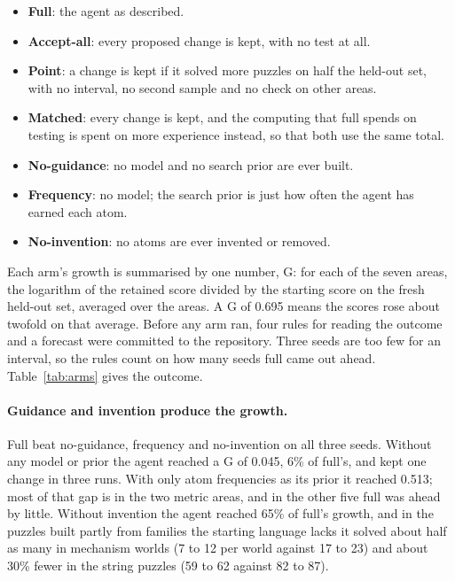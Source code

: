 \documentclass[11pt]{article}
\begin{document}
\begin{itemize}[leftmargin=*]
\item \textbf{Full}: the agent as described.
\item \textbf{Accept-all}: every proposed change is kept, with no test at all.
\item \textbf{Point}: a change is kept if it solved more puzzles on half the held-out set, with no interval, no second sample and no check on other areas.
\item \textbf{Matched}: every change is kept, and the computing that full spends on testing is spent on more experience instead, so that both use the same total.
\item \textbf{No-guidance}: no model and no search prior are ever built.
\item \textbf{Frequency}: no model; the search prior is just how often the agent has earned each atom.
\item \textbf{No-invention}: no atoms are ever invented or removed.
\end{itemize}

Each arm's growth is summarised by one number, G: for each of the seven areas, the logarithm of the retained score divided by the starting score on the fresh held-out set, averaged over the areas. A G of 0.695 means the scores rose about twofold on that average. Before any arm ran, four rules for reading the outcome and a forecast were committed to the repository. Three seeds are too few for an interval, so the rules count on how many seeds full came out ahead. Table~\ref{tab:arms} gives the outcome.



\paragraph{Guidance and invention produce the growth.} Full beat no-guidance, frequency and no-invention on all three seeds. Without any model or prior the agent reached a G of 0.045, 6\% of full's, and kept one change in three runs. With only atom frequencies as its prior it reached 0.513; most of that gap is in the two metric areas, and in the other five full was ahead by little. Without invention the agent reached 65\% of full's growth, and in the puzzles built partly from families the starting language lacks it solved about half as many in mechanism worlds (7 to 12 per world against 17 to 23) and about 30\% fewer in the string puzzles (59 to 62 against 82 to 87).
\end{document}
